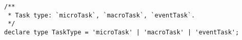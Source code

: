 \begin{verbatim}
/**
 * Task type: `microTask`, `macroTask`, `eventTask`.
 */
declare type TaskType = 'microTask' | 'macroTask' | 'eventTask';
\end{verbatim}
